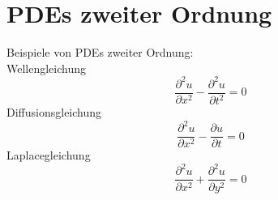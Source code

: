 \section{PDEs zweiter Ordnung}
Beispiele von PDEs zweiter Ordnung:\\
Wellengleichung
\begin{equation}
	\frac{\partial^2 u}{\partial x^2}-\frac{\partial^2 u}{\partial t^2}=0
\end{equation}
Diffusionsgleichung
\begin{equation}
	\frac{\partial^2 u}{\partial x^2}-\frac{\partial u}{\partial t}=0
\end{equation}
Laplacegleichung
\begin{equation}
	\frac{\partial^2 u}{\partial x^2}+\frac{\partial^2 u}{\partial y^2}=0
\end{equation}

